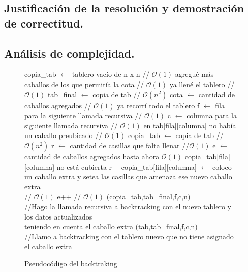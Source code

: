 \vspace*{0.6cm}

\subsection{Justificación de la resolución y demostración de correctitud.}

\vspace*{0.3cm}


\vspace*{0.6cm}

\subsection{Análisis de complejidad.}

\vspace*{0.3cm}


\begin{figure}
\begin{codebox}
\li copia_tab $\leftarrow$ tablero vacío de n x n // $\mathcal{O}(1)$
\li \If agregué más caballos de los que permitía la cota   // $\mathcal{O}(1)$
\li \quad \Return   
\li \If ya llené el tablero                                // $\mathcal{O}(1)$
\li \quad tab_final $\leftarrow$ copia de tab              // $\mathcal{O}(n^2)$
\li \quad cota $\leftarrow$ cantidad de caballos agregados        // $\mathcal{O}(1)$
\li \quad \Return
\li \If ya recorrí todo el tablero
\li \quad \Return
\li f $\leftarrow$ fila para la siguiente llamada recursiva  // $\mathcal{O}(1)$
\li c $\leftarrow$ columna para la siguiente llamada recursiva  // $\mathcal{O}(1)$
\li \If en tab[fila][columna] no había un caballo preubicado      // $\mathcal{O}(1)$
\li \quad copia_tab $\leftarrow$ copia de tab              // $\mathcal{O}(n^2)$
\li \quad r $\leftarrow$ cantidad de casillas que falta llenar  //$\mathcal{O}(1)$
\li \quad e $\leftarrow$ cantidad de caballos agregados hasta ahora $\mathcal{O}(1)$
\li \quad \If copia_tab[fila][columna] no está cubierta
\li \quad \quad r- -
\li \quad copia_tab[fila][columna] $\leftarrow$ coloco un caballo extra y setea las casillas que amenaza ese nuevo caballo extra    \\   // $\mathcal{O}(1)$
\li \quad e++          // $\mathcal{O}(1)$
\li {}(copia_tab,tab_final,f,c,n) \\
//Hago la llamada recursiva a backtracking con el nuevo tablero y los datos actualizados \\
teniendo en cuenta el caballo extra
(tab,tab_final,f,c,n)\\
//Llamo a backtracking con el tablero nuevo que no tiene asignado el caballo extra
\end{codebox}
\caption{Pseudocódigo del backtraking}\label{code:backtraking}
\end{figure}
\FloatBarrier

